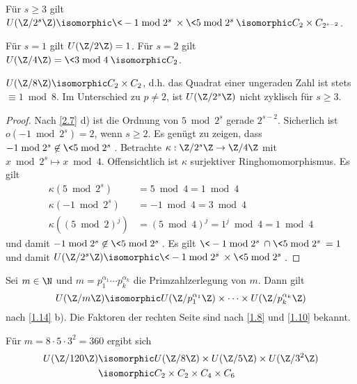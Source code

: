 \begin{st} \label{2.10}
	Für $s \ge 3$ gilt $U(\Z / 2^s \Z) \isomorphic \< - 1 \bmod 2^s \> \times \< 5 \bmod 2^s \> \isomorphic C_2 \times C_{2^{s-2}}$.

	Für $s = 1$ gilt $U(\Z / 2 \Z) = 1$.
	Für $s = 2$ gilt $U(\Z / 4 \Z) = \< 3 \bmod 4 \> \isomorphic C_2$.
	\begin{note}
		$U(\Z / 8 \Z) \isomorphic C_2 \times C_2$, d.h. das Quadrat einer ungeraden Zahl ist stets $\equiv 1 \bmod 8$.
		Im Unterschied zu $p \neq 2$, ist $U(\Z / 2^s \Z)$ nicht zyklisch für $s \ge 3$.
	\end{note}
	\begin{proof}
		Nach \ref{2.7} d) ist die Ordnung von $5 \bmod 2^s$ gerade $2^{s-2}$.
		Sicherlich ist $o(-1 \bmod 2^s) = 2$, wenn $s \ge 2$.
		Es genügt zu zeigen, dass $-1 \bmod 2^s \not\in \< 5 \bmod 2^s \>$.
		Betrachte $\kappa: \Z / 2^s \Z \to \Z / 4 \Z$ mit $x \bmod 2^s \mapsto x \bmod 4$.
		Offensichtlich ist $\kappa$ surjektiver Ringhomomorphismus.
		Es gilt
		\begin{align*}
			\kappa(5 \bmod 2^s) &= 5 \bmod 4 = 1 \bmod 4 \\
			\kappa(-1 \bmod 2^s) &= -1 \bmod 4 = 3 \bmod 4 \\
			\kappa((5 \bmod 2)^j) &= (5 \bmod 4)^j = 1^j \bmod 4 = 1 \bmod 4
		\end{align*}
		und damit $-1 \bmod 2^s \not\in \< 5 \bmod 2^s\>$.
		Es gilt $\<-1 \bmod 2^s\> \cap \< 5 \bmod 2^s\> = 1$ und damit $U(\Z / 2^s \Z) \isomorphic \<-1 \bmod 2^s \> \times \< 5 \bmod 2^s \>$.
	\end{proof}
\end{st}

\begin{kor} \label{2.11}
	Sei $m \in \N$ und $m = p_1^{\alpha_1} \dotsb p_k^{\alpha_k}$ die Primzahlzerlegung von $m$.
	Dann gilt
	\[
		U(\Z / m\Z) \isomorphic U(\Z / p_1^{\alpha_1}\Z) \times \dotsb \times U(\Z / p_k^{\alpha_k} \Z)
	\]
	nach \ref{1.14} b).
	Die Faktoren der rechten Seite sind nach \ref{1.8} und \ref{1.10} bekannt.
\end{kor}

\begin{ex*}
	Für $m = 8 \cdot 5 \cdot 3^2 = 360$ ergibt sich
	\begin{align*}
		U(\Z / 120 \Z)
		&\isomorphic U(\Z / 8 \Z) \times U(\Z / 5 \Z) \times U(\Z / 3^2 \Z) \\
		&\isomorphic C_2 \times C_2 \times C_4 \times C_6
	\end{align*}
\end{ex*}


